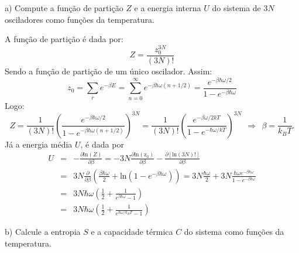 \begin{enumerate}[start=1,label={\bfseries Q\arabic*.}]
a) Compute a função de partição $Z$ e a energia interna $U$ do sistema de $3N$ osciladores como funções da temperatura.

\resposta A função de partição é dada por:
$$
Z = \frac{z_{0}^{3N}}{(3N)!}
$$
Sendo a função de partição de um único oscilador. Assim:
$$
z_{0} = \sum_{r} e^{-\beta E} = \sum_{n=0}^{\infty} e^{- \beta \hbar \omega ( n + 1/2 ) } = \frac{e^{-\beta \hbar \omega /2}}{1 - e^{-\beta \hbar \omega}}
$$
Logo:
$$
Z = \frac{1}{(3N)!} \left( \frac{e^{-\beta \hbar \omega/2}}{1 - e^{-\beta \hbar \omega ( n + 1/2 ) } } \right)^{3N} =
\frac{1}{(3N)!} \left( \frac{e^{-\beta \omega / 2kT}}{1 - e^{- \hbar \omega / kT } } \right)^{3N} \ \ \Rightarrow \ \ \beta = \frac{1}{k_{B}T}.
$$
Já a energia média $U$, é dada por
$$
\begin{array}{ccl}
  U & = & - \frac{\partial \mathrm{ln}(Z) }{\partial \beta} = - 3N \frac{\partial \mathrm{ln (z_{0})}}{\partial \beta} - \frac{\partial [\mathrm{ln} (3N)!]}{\partial \beta} \\
   & = & 3N \frac{\partial }{\partial \beta} \left(  \frac{\beta \hbar \omega}{2} + \mathrm{ln}  \left( 1 - e^{-\beta \hbar \omega} \right) \right) = 3N \frac{\hbar \omega}{2} + 3N \frac{\hbar \omega e^{- \beta \hbar \omega}}{1 - e^{-\beta \hbar \omega}} \\
   & = & 3N \hbar \omega \left( \frac{1}{2} +  \frac{1}{e^{\beta \hbar \omega} - 1} \right) \\
   & = & 3N \hbar \omega \left( \frac{1}{2} +  \frac{1}{e^{ \hbar \omega/k_{B}T } - 1} \right)
\end{array}
$$

b) Calcule a entropia $S$ e a capacidade térmica $C$ do sistema como funções da temperatura.


\end{enumerate}
